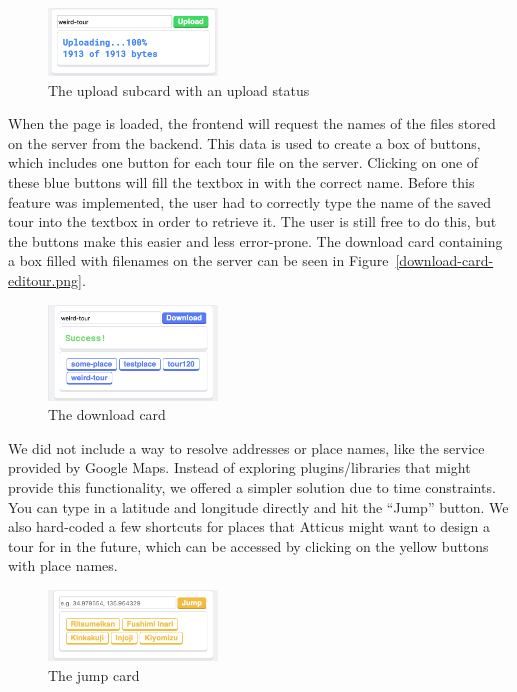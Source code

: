 \documentclass[a4paper, 10pt, american, titlepage]{article}
\begin{document}
\begin{figure}[h]
	\centering
    \includegraphics[width=0.4\textwidth]{uploading-message-editour.png}
    \caption{The upload subcard with an upload status}
	\label{fig:uploadingMessage}
\end{figure}

When the page is loaded, the frontend will request the names of the files
stored on the server from the backend. This data is used to create a box of
buttons, which includes one button for each tour file on the server. Clicking
on one of these blue buttons will fill the textbox in with the correct name.
Before this feature was implemented, the user had to correctly type the name of
the saved tour into the textbox in order to retrieve it. The user is still free
to do this, but the buttons make this easier and less error-prone. The download
card containing a box filled with filenames on the server can be seen in
Figure~\ref{download-card-editour.png}.

\begin{figure}[h]
	\centering
    \includegraphics[width=0.4\textwidth]{download-card-editour.png}
    \caption{The download card}
	\label{fig:downloadCard}
\end{figure}

We did not include a way to resolve addresses or place names, like the service
provided by Google Maps. Instead of exploring plugins/libraries that might
provide this functionality, we offered a simpler solution due to time
constraints.  You can type in a latitude and longitude directly and hit the
``Jump'' button. We also hard-coded a few shortcuts for places that Atticus
might want to design a tour for in the future, which can be accessed by
clicking on the yellow buttons with place names.

\begin{figure}[h]
	\centering
    \includegraphics[width=0.4\textwidth]{jump-card-editour.png}
    \caption{The jump card}
	\label{fig:jumpCard}
\end{figure}
\end{document}
